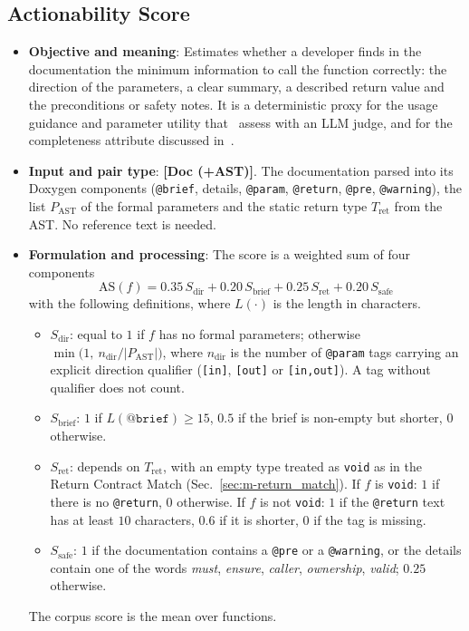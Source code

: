 \subsection{Actionability Score}
\label{sec:m-actionability}
\begin{itemize}[leftmargin=*, label=\textbullet]
	\item \textbf{Objective and meaning}: Estimates whether a developer finds in the documentation the
	minimum information to call the function correctly: the direction of the parameters, a clear
	summary, a described return value and the preconditions or safety notes. It is a deterministic
	proxy for the usage guidance and parameter utility that~\cite{yang_docagent_2025} assess with an
	LLM judge, and for the completeness attribute discussed in~\cite{rai_review_2022}.

	\item \textbf{Input and pair type}: \textbf{[Doc (+AST)]}. The documentation parsed into its
	Doxygen components (\texttt{@brief}, details, \texttt{@param}, \texttt{@return}, \texttt{@pre},
		\texttt{@warning}), the list $P_{\mathrm{AST}}$ of the formal parameters and the static return
		type $T_{\mathrm{ret}}$ from the AST. No reference text is needed.

	\item \textbf{Formulation and processing}: The score is a weighted sum of four components
	\begin{equation}
		\mathrm{AS}(f) = 0.35\,S_{\mathrm{dir}} + 0.20\,S_{\mathrm{brief}}
		+ 0.25\,S_{\mathrm{ret}} + 0.20\,S_{\mathrm{safe}}
		\label{eq:actionability}
	\end{equation}
	with the following definitions, where $L(\cdot)$ is the length in characters.
	\begin{itemize}
		\item $S_{\mathrm{dir}}$: equal to $1$ if $f$ has no formal parameters; otherwise
		$\min\bigl(1,\ n_{\mathrm{dir}}/|P_{\mathrm{AST}}|\bigr)$, where $n_{\mathrm{dir}}$ is the number
		of \texttt{@param} tags carrying an explicit direction qualifier (\texttt{[in]},
		\texttt{[out]} or \texttt{[in,out]}). A tag without qualifier does not count.
		\item $S_{\mathrm{brief}}$: $1$ if $L(\texttt{@brief})\ge 15$, $0.5$ if the brief is
		non-empty but shorter, $0$ otherwise.
		\item $S_{\mathrm{ret}}$: depends on $T_{\mathrm{ret}}$, with an empty type treated as
		\texttt{void} as in the Return Contract Match (Sec.~\ref{sec:m-return_match}). If $f$ is
		\texttt{void}: $1$ if there is no \texttt{@return}, $0$ otherwise. If $f$ is not
		\texttt{void}: $1$ if the \texttt{@return} text has at least $10$ characters, $0.6$ if it is
		shorter, $0$ if the tag is missing.
		\item $S_{\mathrm{safe}}$: $1$ if the documentation contains a \texttt{@pre} or a
		\texttt{@warning}, or the details contain one of the words \emph{must}, \emph{ensure},
		\emph{caller}, \emph{ownership}, \emph{valid}; $0.25$ otherwise.
	\end{itemize}
	The corpus score is the mean over functions.


\end{itemize}
